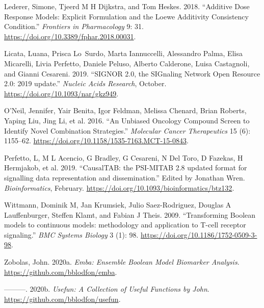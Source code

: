 \documentclass[
  12pt,
]{book}
\begin{document}
\leavevmode\hypertarget{ref-Lederer2018}{}%
Lederer, Simone, Tjeerd M H Dijkstra, and Tom Heskes. 2018. ``Additive Dose Response Models: Explicit Formulation and the Loewe Additivity Consistency Condition.'' \emph{Frontiers in Pharmacology} 9: 31. \url{https://doi.org/10.3389/fphar.2018.00031}.

\leavevmode\hypertarget{ref-Licata2019}{}%
Licata, Luana, Prisca Lo~Surdo, Marta Iannuccelli, Alessandro Palma, Elisa Micarelli, Livia Perfetto, Daniele Peluso, Alberto Calderone, Luisa Castagnoli, and Gianni Cesareni. 2019. ``SIGNOR 2.0, the SIGnaling Network Open Resource 2.0: 2019 update.'' \emph{Nucleic Acids Research}, October. \url{https://doi.org/10.1093/nar/gkz949}.

\leavevmode\hypertarget{ref-ONeil2016}{}%
O'Neil, Jennifer, Yair Benita, Igor Feldman, Melissa Chenard, Brian Roberts, Yaping Liu, Jing Li, et al. 2016. ``An Unbiased Oncology Compound Screen to Identify Novel Combination Strategies.'' \emph{Molecular Cancer Therapeutics} 15 (6): 1155--62. \url{https://doi.org/10.1158/1535-7163.MCT-15-0843}.

\leavevmode\hypertarget{ref-Perfetto2019}{}%
Perfetto, L, M L Acencio, G Bradley, G Cesareni, N Del Toro, D Fazekas, H Hermjakob, et al. 2019. ``CausalTAB: the PSI-MITAB 2.8 updated format for signalling data representation and dissemination.'' Edited by Jonathan Wren. \emph{Bioinformatics}, February. \url{https://doi.org/10.1093/bioinformatics/btz132}.

\leavevmode\hypertarget{ref-Wittmann2009}{}%
Wittmann, Dominik M, Jan Krumsiek, Julio Saez-Rodriguez, Douglas A Lauffenburger, Steffen Klamt, and Fabian J Theis. 2009. ``Transforming Boolean models to continuous models: methodology and application to T-cell receptor signaling.'' \emph{BMC Systems Biology} 3 (1): 98. \url{https://doi.org/10.1186/1752-0509-3-98}.

\leavevmode\hypertarget{ref-R-emba}{}%
Zobolas, John. 2020a. \emph{Emba: Ensemble Boolean Model Biomarker Analysis}. \url{https://github.com/bblodfon/emba}.

\leavevmode\hypertarget{ref-R-usefun}{}%
---------. 2020b. \emph{Usefun: A Collection of Useful Functions by John}. \url{https://github.com/bblodfon/usefun}.
\end{document}
